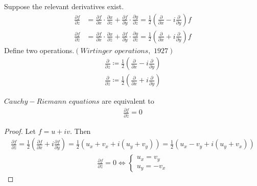 \vspace{2em}
Suppose the relevant derivatives exist.
\begin{align}
	\frac{\partial f}{\partial z} &= \frac{\partial f}{\partial x} \cdot \frac{\partial x}{\partial z} + \frac{\partial f}{\partial y} \cdot \frac{\partial y}{\partial z} = \frac{1}{2} \left( \frac{\partial}{\partial x} - i \frac{\partial}{\partial y} \right) f \\
	\frac{\partial f}{\partial \overline{z}} &= \frac{\partial f}{\partial x} \cdot \frac{\partial x}{\partial \overline{z}} + \frac{\partial f}{\partial y} \cdot \frac{\partial y}{\partial \overline{z}} = \frac{1}{2} \left( \frac{\partial}{\partial x} + i \frac{\partial}{\partial y} \right) f
\end{align}
Define two operations.$\left( Wirtinger \,\, operations , \,\, 1927 \right)$
\begin{align}
	\frac{\partial}{\partial z} \coloneqq \frac{1}{2} \left( \frac{\partial}{\partial x} - i \frac{\partial}{\partial y} \right) \\
	\frac{\partial}{\partial \overline{z}} \coloneqq \frac{1}{2} \left( \frac{\partial}{\partial x} + i \frac{\partial}{\partial y} \right)
\end{align}

\vspace{2em}
\begin{proposition}\label{prop 2.5.1}
	$Cauchy - Riemann \,\, equations$ are equivalent to
	\begin{align}
		\frac{\partial f}{\partial \overline{z}} = 0
	\end{align}
	
	\vspace{2em}
	\begin{proof}
		Let $f = u + i v$. Then 
		\begin{align}
			\frac{\partial f}{\partial \overline{z}} = \frac{1}{2} \left( \frac{\partial f}{\partial x} + i \frac{\partial f}{\partial y} \right) = \frac{1}{2} \left( u_x + v_x + i (u_y + v_y) \right) = \frac{1}{2} \left( u_x - v_y + i (u_y + v_x) \right)
		\end{align}
		\begin{align}
			\frac{\partial f}{\partial \overline{z}} = 0 \Leftrightarrow 
			\begin{cases}
				u_x = v_y \\
				u_y = - v_x
			\end{cases}
		\end{align}
	\end{proof}
\end{proposition}

